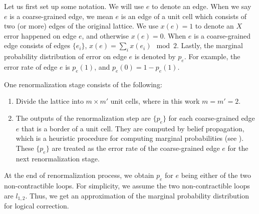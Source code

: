 Let us first set up some notation.
We will use $e$ to denote an edge.
When we say $e$ is a coarse-grained edge, we mean $e$ is an edge of a unit cell which consists of two (or more) edges of the original lattice.
We use $x(e) = 1$ to denote an $X$ error happened on edge $e$, and otherwise $x(e)=0$.
When $e$ is a coarse-grained edge consists of edges $\{e_i\}$, $x(e) = \sum_i x(e_i) \mod 2$.
Lastly, the marginal probability distribution of error on edge $e$ is denoted by $p_e$.
For example, the error rate of edge $e$ is $p_e(1)$, and $p_e(0) = 1-p_e(1)$.

One renormalization stage consists of the following:
\begin{enumerate}
	\item Divide the lattice into $m\times m'$ unit cells, where in this work $m=m'=2$.
	\item The outputs of the renormalization step are $\{p_e\}$ for each coarse-grained edge $e$ that is a border of a unit cell.
	They are computed by belief propagation, which is a heuristic procedure for computing marginal probabilities (see ).
	These $\{p_e\}$ are treated as the error rate of the coarse-grained edge $e$ for the next renormalization stage.
\end{enumerate}

At the end of renormalization process, we obtain $p_e$ for $e$ being either of the two non-contractible loops.
For simplicity, we assume the two non-contractible loops are $l_{1,2}$.
Thus, we get an approximation of the marginal probability distribution for logical correction.
